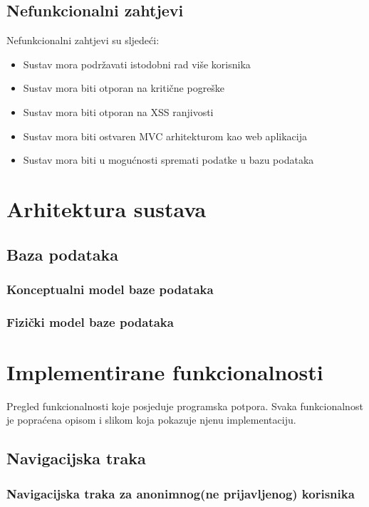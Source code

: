 \documentclass[times, utf8, zavrsni]{fer}
\begin{document}
\section{Nefunkcionalni zahtjevi}
Nefunkcionalni zahtjevi su sljedeći:

\begin{itemize}
	\item Sustav mora podržavati istodobni rad više korisnika
	\item Sustav mora biti otporan na kritične pogreške
	\item Sustav mora biti otporan na XSS ranjivosti
	\item Sustav mora biti ostvaren MVC arhitekturom kao web aplikacija
	\item Sustav mora biti u mogućnosti spremati podatke u bazu podataka
\end{itemize}

\chapter{Arhitektura sustava}
\section{Baza podataka}
\subsection{Konceptualni model baze podataka}

\subsection{Fizički model baze podataka}

\chapter{Implementirane funkcionalnosti}
Pregled funkcionalnosti koje posjeduje programska potpora. Svaka funkcionalnost je popraćena opisom i slikom koja pokazuje njenu implementaciju.

\section{Navigacijska traka}

\subsection{Navigacijska traka za anonimnog(ne prijavljenog) korisnika}
\end{document}
